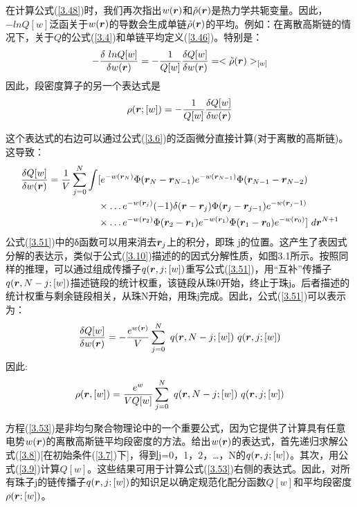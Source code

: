 在计算公式(\ref{3.48})时，我们再次指出$w(\bm{r})$和$\tilde{\rho}(\bm{r})$是热力学共轭变量。因此，$-lnQ[w]$泛函关于$w(\bm{r})$的导数会生成单链$\tilde{\rho}(\bm{r})$的平均。例如：在离散高斯链的情况下，关于$Q$的公式(\ref{3.4})和单链平均定义(\ref{3.46})。特别是：
\begin{equation}\label{3.49}
-\frac{\delta~lnQ[w]}{\delta w(\bm{r})}=-\frac{1}{Q[w]}\frac{\delta Q[w]}{\delta w(\bm{r})}=<\tilde{\rho}(\bm{r})>_{[w]}
\end{equation}
因此，段密度算子的另一个表达式是
\begin{equation}\label{3.50}
\rho(\bm{r};[w])=-\frac{1}{Q[w]}\frac{\delta Q[w]}{\delta w(\bm{r})}
\end{equation}

这个表达式的右边可以通过公式(\ref{3.6})的泛函微分直接计算(对于离散的高斯链)。这导致：
\begin{equation}\label{3.51}
\begin{aligned}
\frac{\delta Q[w]}{\delta w(\bm{r})}=\frac{1}{V}\sum_{j=0}^{N}\int &[e^{-w(\bm{r}_{N})}\Phi(\bm{r}_{N}-\bm{r}_{N-1})e^{-w(\bm{r}_{N-1})}\Phi(\bm{r}_{N-1}-\bm{r}_{N-2}) \\ &\times \ldots e^{-w(\bm{r}_{j})}(-1)\delta(\bm{r}-\bm{r}_j)\Phi(\bm{r}_j-\bm{r}_{j-1})e^{-w(\bm{r}_j-1)}\\ & \times \ldots e^{-w(\bm{r}_{2})}\Phi(\bm{r}_{2}-\bm{r}_{1})e^{-w(\bm{r}_{1})}\Phi(\bm{r}_{1}-\bm{r}_{0})e^{-w(\bm{r}_{0})}]~d \bm{r}^{N+1}
\end{aligned}
\end{equation}
公式(\ref{3.51})中的δ函数可以用来消去$\bm{r}_{j}$上的积分，即珠 j的位置。这产生了表因式分解的表达示，类似于公式(\ref{3.10})描述的的因式分解性质，如图3.1所示。按照同样的推理，可以通过组成传播子$q(\bm{r},j;[w])$重写公式(\ref{3.51})，用“互补”传播子$q(\bm{r},N-j;[w])$描述链段的统计权重，该链段从珠0开始，终止于珠j。后者描述的统计权重与剩余链段相关，从珠N开始，用珠j完成。因此，公式(\ref{3.51})可以表示为：
\begin{equation}\label{3.52}
\frac{\delta Q[w]}{\delta w(\bm{r})}=-\frac{e^{w(\bm{r})}}{V}\sum_{j=0}^{N}~q(\bm{r},N-j;[w])~q(\bm{r},j;[w])
\end{equation}
因此:	
\begin{equation}\label{3.53}
\rho(\bm{r},[w])=\frac{e^{w}}{VQ[w]}\sum_{j=0}^{N}~q(\bm{r},N-j;[w])~q(\bm{r},j;[w])
\end{equation}

方程(\ref{3.53})是非均匀聚合物理论中的一个重要公式，因为它提供了计算具有任意电势$w(\bm{r})$的离散高斯链平均段密度的方法。给出$w(\bm{r})$的表达式，首先递归求解公式(\ref{3.8})[在初始条件(\ref{3.7})下]，得到j=0，1，2，…，N的$q(\bm{r},j;[w])$。其次，用公式(\ref{3.9})计算$Q[w]$。这些结果可用于计算公式(\ref{3.53})右侧的表达式。因此，对所有珠子j的链传播子$q(\bm{r},j;[w])$的知识足以确定规范化配分函数$Q[w]$和平均段密度$\rho(\bm{r};[w])$。

